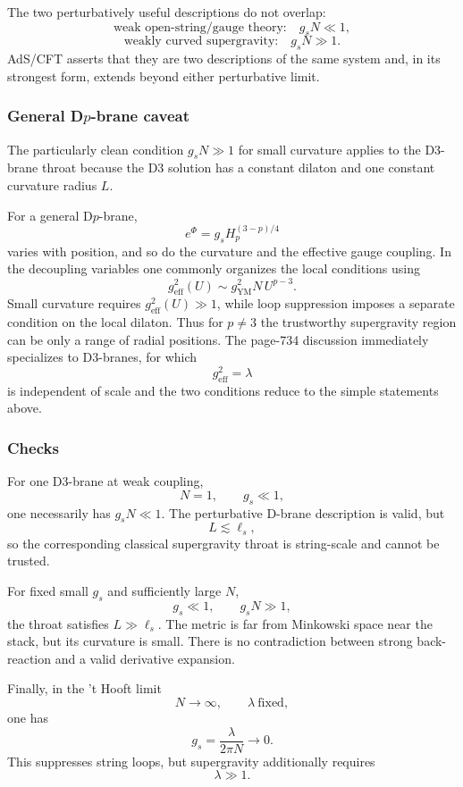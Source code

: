 \documentclass[
  10pt,
  a4paper,
  openany]{book}
\begin{document}
The two perturbatively useful descriptions do not overlap: \[
\text{weak open-string/gauge theory:}\quad g_sN\ll1,
\] \[
\text{weakly curved supergravity:}\quad g_sN\gg1.
\] AdS/CFT asserts that they are two descriptions of the same system
and, in its strongest form, extends beyond either perturbative limit.

\subsubsection{\texorpdfstring{General D\(p\)-brane
caveat}{General Dp-brane caveat}}\label{general-dp-brane-caveat}

The particularly clean condition \(g_sN\gg1\) for small curvature
applies to the D3-brane throat because the D3 solution has a constant
dilaton and one constant curvature radius \(L\).

For a general D\(p\)-brane, \[
e^\Phi
=g_sH_p^{(3-p)/4}
\] varies with position, and so do the curvature and the effective gauge
coupling. In the decoupling variables one commonly organizes the local
conditions using \[
g_{\mathrm{eff}}^2(U)
\sim
g_{\mathrm{YM}}^2N\,U^{p-3}.
\] Small curvature requires \(g_{\mathrm{eff}}^2(U)\gg1\), while loop
suppression imposes a separate condition on the local dilaton. Thus for
\(p\neq3\) the trustworthy supergravity region can be only a range of
radial positions. The page-734 discussion immediately specializes to
D3-branes, for which \[
g_{\mathrm{eff}}^2=\lambda
\] is independent of scale and the two conditions reduce to the simple
statements above.

\subsubsection{Checks}\label{checks-37}

For one D3-brane at weak coupling, \[
N=1,
\qquad
g_s\ll1,
\] one necessarily has \(g_sN\ll1\). The perturbative D-brane
description is valid, but \[
L\lesssim\ell_s,
\] so the corresponding classical supergravity throat is string-scale
and cannot be trusted.

For fixed small \(g_s\) and sufficiently large \(N\), \[
g_s\ll1,
\qquad
g_sN\gg1,
\] the throat satisfies \(L\gg\ell_s\). The metric is far from Minkowski
space near the stack, but its curvature is small. There is no
contradiction between strong back-reaction and a valid derivative
expansion.

Finally, in the 't Hooft limit \[
N\to\infty,
\qquad
\lambda\ \text{fixed},
\] one has \[
g_s=\frac{\lambda}{2\pi N}\to0.
\] This suppresses string loops, but supergravity additionally requires
\[
\lambda\gg1.
\]
\end{document}
